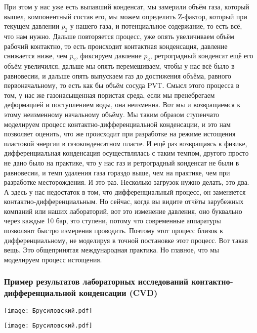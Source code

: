 \documentclass[main.tex]{subfiles}
\begin{document}
При этом у нас уже есть выпавший конденсат, мы замерили объём газа, который вышел, компонентный состав его, мы можем определить Z-фактор, который при текущем давлении $p_2$ у нашего газа, и потенциальное содержание, то есть всё, что нам нужно.
Дальше повторяется процесс, уже опять увеличиваем объём рабочий контактно, то есть происходит контактная конденсация, давление снижается ниже, чем $p_2$, фиксируем давление $p_3$, ретроградный конденсат ещё его объём увеличился, дальше мы опять перемешиваем, чтобы у нас всё было в равновесии, и дальше опять выпускаем газ до достижения объёма, равного первоначальному, то есть как бы объём сосуда PVT.
Смысл этого процесса в том, у нас же газонасыщенная пористая среда, если мы пренебрегаем деформацией и поступлением воды, она неизменна.
Вот мы и возвращаемся к этому неизменному начальному объёму.
Мы таким образом ступенчато моделируем процесс контактно-дифференциальной конденсации, и это нам позволяет оценить, что же происходит при разработке на режиме истощения пластовой энергии в газоконденсатном пласте.
И ещё раз возвращаясь к физике, дифференциальная конденсация осуществлялась с таким темпом, другого просто не дано было на практике, что у нас газ и ретроградный конденсат не были в равновесии, и темп удаления газа гораздо выше, чем на практике, чем при разработке месторождения.
И это раз.
Несколько загрузок нужно делать, это два.
А здесь у нас недостаток в том, что дифференциальный процесс, он заменяется контактно-дифференциальным.
Но сейчас, когда вы видите отчёты зарубежных компаний или наших лабораторий, вот это изменение давления, оно буквально через каждые 10 бар, это ступени, потому что современные аппаратуры позволяют быстро измерения проводить.
Поэтому этот процесс близок к дифференциальному, не моделируя в точной постановке этот процесс.
Вот такая вещь.
Это общепринятая международная практика.
Но главное, что мы моделируем процесс истощения.

\subsubsection{Пример результатов лабораторных исследований контактно-дифференциальной конденсации (CVD)}

\begin{center}
\texttt{[image: Брусиловский.pdf]}
\end{center}

\begin{center}
\texttt{[image: Брусиловский.pdf]}
\end{center}
\end{document}
